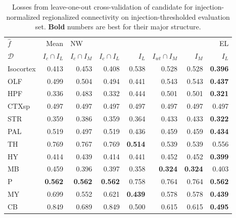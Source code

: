 \begin{table}[H]
\begin{tabular}{lrrrrrrr}
\toprule
$\widehat f$ &           Mean & \multicolumn{5}{l}{NW} &     EL \\
$\mathcal D$ & $I_c \cap I_L$ & $I_c \cap I_M$ & $I_c \cap I_L$ &  $I_L$ & $I_{wt} \cap I_M$ &  $I_M$ &  $I_L$ \\
\midrule
Isocortex &          0.413 &          0.453 &          0.408 &  0.538 &             0.528 &  0.528 &  \textbf{0.396} \\
OLF       &          0.499 &          0.504 &          0.494 &  0.441 &             0.543 &  0.543 &  \textbf{0.437} \\
HPF       &          0.336 &          0.483 &          0.332 &  0.444 &             0.501 &  0.501 & \textbf{ 0.321} \\
CTXsp     &          0.497 &          0.497 &          0.497 &  0.497 &             0.497 &  0.497 &  0.497 \\
STR       &          0.359 &          0.386 &          0.359 &  0.364 &             0.433 &  0.433 &\textbf{  0.322} \\
PAL       &          0.519 &          0.497 &          0.519 &  0.436 &             0.459 &  0.459 &\textbf{  0.434} \\
TH        &          0.769 &          0.767 &          0.769 &  \textbf{0.514} &             0.539 &  0.539 &  0.556 \\
HY        &          0.414 &          0.439 &          0.414 &  0.441 &             0.452 &  0.452 & \textbf{ 0.399} \\
MB        &          0.459 &          0.396 &          0.397 &  0.358 &         \textbf{    0.324 }& \textbf{ 0.324 }&  0.403 \\
P         &          \textbf{0.562 }&    \textbf{     0.562 }&      \textbf{    0.562 }&  0.758 &             0.764 &  0.764 &  \textbf{0.562} \\
MY        &          0.699 &          0.552 &          0.621 &  \textbf{0.439 }&             0.578 &  0.578 & \textbf{ 0.439} \\
CB        &          0.849 &          0.689 &          0.849 &  0.500 &             0.615 &  0.615 & \textbf{ 0.495} \\
\bottomrule
\end{tabular}
\caption{Losses from leave-one-out cross-validation of candidate for injection-normalized regionalized connectivity on injection-thresholded evaluation set. \textbf{Bold} numbers are best for their major structure.} 
\label{tab:eval_size}
\end{table}

